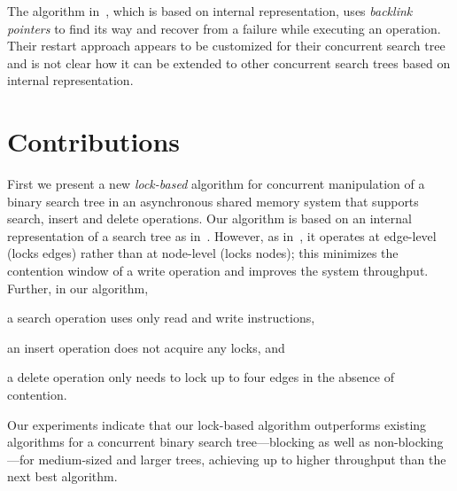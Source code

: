The algorithm in~\cite{ChaDan+:2014:PODC},  which is based on internal representation, uses \emph{backlink pointers} to find its way and recover from a failure while executing an operation. Their restart approach appears to be customized for their concurrent search tree and is not clear how it can be extended to other concurrent search trees based on internal representation.

\section{Contributions}
First we present a new \emph{lock-based} algorithm for concurrent manipulation of a binary search tree in an asynchronous shared memory system that supports search, insert and delete operations. Our algorithm is based on an internal representation of a search tree as in~\cite{DraVec+:2014:PPoPP,ArbAtt:2014:PODC}. However, as in~\cite{NatMit:2014:PPoPP}, it operates at edge-level (locks edges) rather than at node-level (locks nodes); this minimizes the contention window of a write operation and improves the system throughput. 
Further, in our algorithm, 
\begin{enumerate*}[label=(\roman*)]
\item a search operation uses only read and write instructions, 
\item an insert operation does not acquire any locks, and
\item a delete operation only needs to lock up to four edges in the absence of contention.
\end{enumerate*}
Our experiments indicate that our lock-based algorithm outperforms existing algorithms for a concurrent binary search 
tree---blocking as well as non-blocking---for medium-sized and larger trees, achieving up to \castleMaximumgap{} higher throughput than the next best algorithm.

